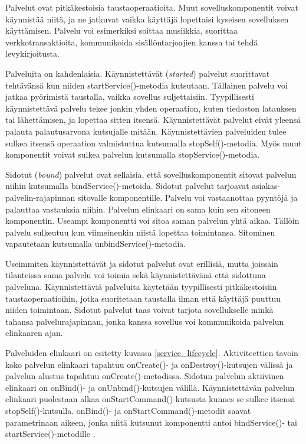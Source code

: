 Palvelut ovat pitkäkestoisia taustaoperaatioita. Muut sovelluskomponentit voivat käynnistää niitä, ja ne jatkuvat vaikka käyttäjä lopettaisi kyseisen sovelluksen käyttämisen. Palvelu voi esimerkiksi soittaa musiikkia, suorittaa verkkotransaktioita, kommunikoida sisällöntarjoajien kanssa tai tehdä levykirjoitusta.

Palveluita on kahdenlaisia. Käynnistettävät (\emph{started}) palvelut suorittavat tehtävänsä kun niiden startService()-metodia kutsutaan. Tällainen palvelu voi jatkaa pyörimistä taustalla, vaikka sovellus suljettaisiin. Tyypillisesti käynnistettävä palvelu tekee jonkin yhden operaation, kuten tiedoston latauksen tai lähettämisen, ja lopettaa sitten itsensä. Käynnistettävät palvelut eivät yleensä palauta palautusarvona kutsujalle mitään. Käynnistettävien palveluiden tulee sulkea itsensä operaation valmistuttua kutsumalla stopSelf()-metodia. Myös muut komponentit voivat sulkea palvelun kutsumalla stopService()-metodia.

Sidotut (\emph{bound}) palvelut ovat sellaisia, että sovelluskomponentit sitovat palvelun niihin kutsumalla bindService()-metoida. Sidotut palvelut tarjoavat asiakas-palvelin-rajapinnan sitovalle komponentille. Palvelu voi vastaanottaa pyyntöjä ja palauttaa vastauksia niihin. Palvelun elinkaari on sama kuin sen sitoneen komponentin. Useampi komponentti voi sitoa saman palvelun yhtä aikaa. Tällöin palvelu sulkeutuu kun viimeinenkin niistä lopettaa toimintansa. Sitominen vapautetaan kutsumalla unbindService()-metodia.

Useimmiten käynnistettävät ja sidotut palvelut ovat erillisiä, mutta joissain tilanteissa sama palvelu voi toimia sekä käynnistettävänä että sidottuna palveluna. Käynnistettäviä palveluita käytetään tyypillisesti pitkäkestoisiin taustaoperaatioihin, jotka suoritetaan taustalla ilman että käyttäjä puuttuu niiden toimintaan. Sidotut palvelut taas voivat tarjota sovellukselle minkä tahansa palvelurajapinnan, jonka kanssa sovellus voi kommunikoida palvelun elinkaaren ajan.

Palveluiden elinkaari on esitetty kuvassa \ref{service_lifecycle}. Aktiviteettien tavoin koko palvelun elinkaari tapahtuu onCreate()- ja onDestroy()-kutsujen välissä ja palvelun alustus tapahtuu onCreate()-metodissa. Sidotun palvelun aktiivinen elinkaari on onBind()- ja onUnbind()-kutsujen välillä. Käynnistettävän palvelun elinkaari puolestaan alkaa onStartCommand()-kutsusta kunnes se sulkee itsensä stopSelf()-kutsulla. onBind()- ja onStartCommand()-metodit saavat parametrinaan aikeen, jonka niitä kutsunut komponentti antoi bindService()- tai startService()-metodille \cite{android}.

